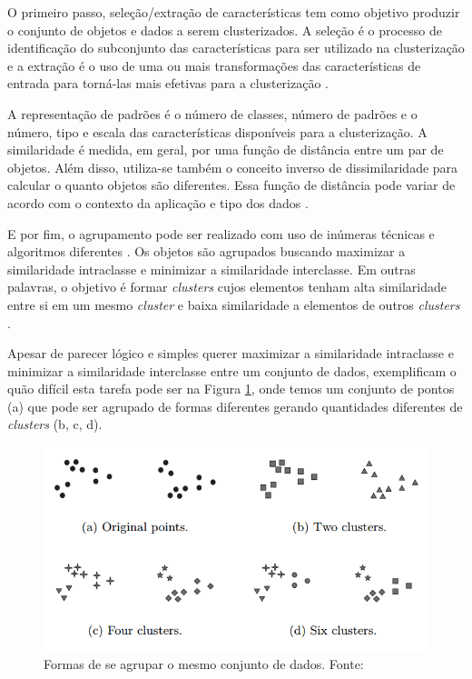 O primeiro passo, seleção/extração de características tem como objetivo produzir o conjunto de objetos e dados a serem clusterizados. 
A seleção é o processo de identificação do subconjunto das características para ser utilizado na clusterização e 
a extração é o uso de uma ou mais transformações das características de entrada para 
torná-las mais efetivas para a clusterização \cite{clustering_review}.

A representação de padrões é o número de classes, número de padrões e o número, tipo e escala
das características disponíveis para a clusterização.
A similaridade é medida, em geral, por uma função de distância entre um par de objetos. Além disso, utiliza-se também
o conceito inverso de dissimilaridade para calcular o quanto objetos são diferentes. Essa função de distância pode variar de acordo 
com o contexto da aplicação e tipo dos dados \cite{clustering_review}. 

E por fim, o agrupamento pode ser realizado com uso de inúmeras técnicas e algoritmos diferentes \cite{clustering_review}.
Os objetos são agrupados buscando maximizar a similaridade intraclasse e minimizar a similaridade interclasse.
Em outras palavras, o objetivo é formar \textit{clusters} cujos elementos tenham alta similaridade entre si em um mesmo \textit{cluster} 
e baixa similaridade a elementos de outros \textit{clusters} \cite{han2011data}.

Apesar de parecer lógico e simples querer maximizar a similaridade intraclasse e minimizar a similaridade interclasse entre um conjunto de dados, 
 exemplificam o quão difícil esta tarefa pode ser na Figura \ref{fig:clusters_difficulty}, onde temos um conjunto
de pontos (a) que pode ser agrupado de formas diferentes gerando quantidades diferentes de \textit{clusters} (b, c, d).

\begin{figure}[ht!]
\centering
\includegraphics[scale=0.4]{figuras/clusters_difficulty.png}
\caption{Formas de se agrupar o mesmo conjunto de dados. Fonte: \cite{tan2013data}}
\label{fig:clusters_difficulty}
\end{figure}

